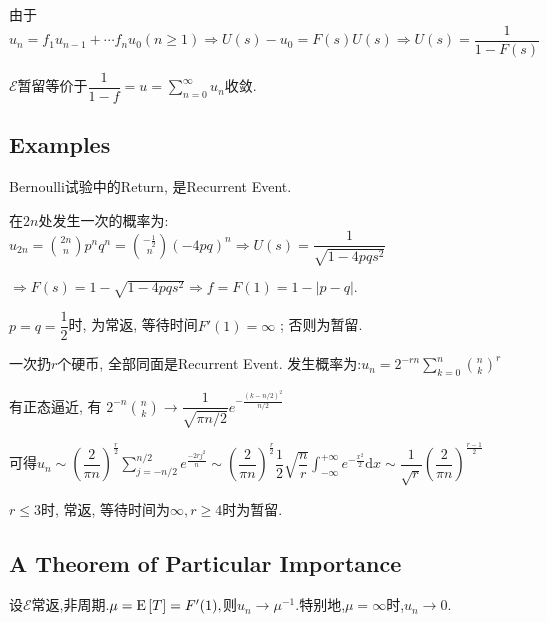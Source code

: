 由于 $ u_n = f_1u_{n-1}+\cdots f_nu_0 (n\ge 1)\Rightarrow U(s)-u_0 = F(s)U(s)\Rightarrow U(s)=\dfrac{1}{1-F(s)}$

$ \mathcal{E}$暂留等价于$ \dfrac{1}{1-f} = u=\sum_{n=0}^\infty u_n$收敛.

\subsection{Examples}
Bernoulli试验中的Return, 是Recurrent Event.

在$2n$处发生一次的概率为: $ u_{2n} = {{2n}\choose{n}} p^nq^n = {{-\frac{1}{2}}\choose{n}} (-4pq)^n \Rightarrow  U(s) = \dfrac{1}{\sqrt{1-4pqs^2}}$

$ \Rightarrow F(s) = 1 - \sqrt{1 - 4pqs^2} \Rightarrow  f = F(1) = 1 - |p-q|. $

$p=q=\dfrac{1}{2}$时, 为常返, 等待时间$F'(1) = \infty $ ;  否则为暂留.

\vspace{0.5cm}

一次扔$r$个硬币, 全部同面是Recurrent Event. 发生概率为:$ u_n = 2^{-rn}\sum_{k=0}^n{n\choose{k}}^r$

有正态逼近, 有 $ 2^{-n}{n\choose{k}} \to \dfrac{1}{\sqrt{\pi n / 2}} e^{-\frac{(k-n/2)^2}{n/2}}$

可得$u_n \sim \left( \dfrac{2}{\pi n} \right) ^{\frac{r}{2}}\sum_{j=-n/2}^{n/2}e^{\frac{-2rj^2}{n}}
\sim \left( \dfrac{2}{\pi n} \right) ^{\frac{r}{2}} \dfrac{1}{2}\sqrt{\dfrac{n}{r}}\int_{-\infty}^{+\infty}e^{-\frac{x^2}{2}} \mathrm{d}x
\sim \dfrac{1}{\sqrt{r}}\left( \dfrac{2}{\pi n}\right) ^{\frac{r-1}{2}}$

$ r \le 3$时, 常返, 等待时间为$ \infty, r \ge 4$时为暂留.


\subsection{A Theorem of Particular Importance}
  设$ \mathcal{E}$常返,非周期.$ \mu = \text{E}\left[T\right] = F'(1),$则$ u_n\to \mu^{-1}$.特别地,$ \mu=\infty$时,$ u_n\to 0$.

